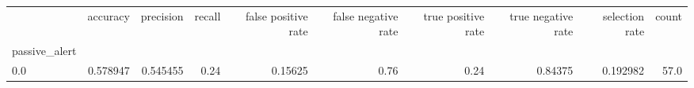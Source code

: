 \begin{tabular}{lrrrrrrrrr}
\toprule
{} &  accuracy &  precision &  recall &  false positive rate &  false negative rate &  true positive rate &  true negative rate &  selection rate &  count \\
passive\_alert &           &            &         &                      &                      &                     &                     &                 &        \\
\midrule
0.0           &  0.578947 &   0.545455 &    0.24 &              0.15625 &                 0.76 &                0.24 &             0.84375 &        0.192982 &   57.0 \\
\bottomrule
\end{tabular}
